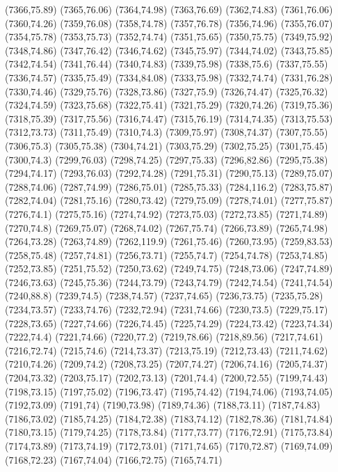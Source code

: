 (7366,75.89)
(7365,76.06)
(7364,74.98)
(7363,76.69)
(7362,74.83)
(7361,76.06)
(7360,74.26)
(7359,76.08)
(7358,74.78)
(7357,76.78)
(7356,74.96)
(7355,76.07)
(7354,75.78)
(7353,75.73)
(7352,74.74)
(7351,75.65)
(7350,75.75)
(7349,75.92)
(7348,74.86)
(7347,76.42)
(7346,74.62)
(7345,75.97)
(7344,74.02)
(7343,75.85)
(7342,74.54)
(7341,76.44)
(7340,74.83)
(7339,75.98)
(7338,75.6)
(7337,75.55)
(7336,74.57)
(7335,75.49)
(7334,84.08)
(7333,75.98)
(7332,74.74)
(7331,76.28)
(7330,74.46)
(7329,75.76)
(7328,73.86)
(7327,75.9)
(7326,74.47)
(7325,76.32)
(7324,74.59)
(7323,75.68)
(7322,75.41)
(7321,75.29)
(7320,74.26)
(7319,75.36)
(7318,75.39)
(7317,75.56)
(7316,74.47)
(7315,76.19)
(7314,74.35)
(7313,75.53)
(7312,73.73)
(7311,75.49)
(7310,74.3)
(7309,75.97)
(7308,74.37)
(7307,75.55)
(7306,75.3)
(7305,75.38)
(7304,74.21)
(7303,75.29)
(7302,75.25)
(7301,75.45)
(7300,74.3)
(7299,76.03)
(7298,74.25)
(7297,75.33)
(7296,82.86)
(7295,75.38)
(7294,74.17)
(7293,76.03)
(7292,74.28)
(7291,75.31)
(7290,75.13)
(7289,75.07)
(7288,74.06)
(7287,74.99)
(7286,75.01)
(7285,75.33)
(7284,116.2)
(7283,75.87)
(7282,74.04)
(7281,75.16)
(7280,73.42)
(7279,75.09)
(7278,74.01)
(7277,75.87)
(7276,74.1)
(7275,75.16)
(7274,74.92)
(7273,75.03)
(7272,73.85)
(7271,74.89)
(7270,74.8)
(7269,75.07)
(7268,74.02)
(7267,75.74)
(7266,73.89)
(7265,74.98)
(7264,73.28)
(7263,74.89)
(7262,119.9)
(7261,75.46)
(7260,73.95)
(7259,83.53)
(7258,75.48)
(7257,74.81)
(7256,73.71)
(7255,74.7)
(7254,74.78)
(7253,74.85)
(7252,73.85)
(7251,75.52)
(7250,73.62)
(7249,74.75)
(7248,73.06)
(7247,74.89)
(7246,73.63)
(7245,75.36)
(7244,73.79)
(7243,74.79)
(7242,74.54)
(7241,74.54)
(7240,88.8)
(7239,74.5)
(7238,74.57)
(7237,74.65)
(7236,73.75)
(7235,75.28)
(7234,73.57)
(7233,74.76)
(7232,72.94)
(7231,74.66)
(7230,73.5)
(7229,75.17)
(7228,73.65)
(7227,74.66)
(7226,74.45)
(7225,74.29)
(7224,73.42)
(7223,74.34)
(7222,74.4)
(7221,74.66)
(7220,77.2)
(7219,78.66)
(7218,89.56)
(7217,74.61)
(7216,72.74)
(7215,74.6)
(7214,73.37)
(7213,75.19)
(7212,73.43)
(7211,74.62)
(7210,74.26)
(7209,74.2)
(7208,73.25)
(7207,74.27)
(7206,74.16)
(7205,74.37)
(7204,73.32)
(7203,75.17)
(7202,73.13)
(7201,74.4)
(7200,72.55)
(7199,74.43)
(7198,73.15)
(7197,75.02)
(7196,73.47)
(7195,74.42)
(7194,74.06)
(7193,74.05)
(7192,73.09)
(7191,74)
(7190,73.98)
(7189,74.36)
(7188,73.11)
(7187,74.83)
(7186,73.02)
(7185,74.25)
(7184,72.38)
(7183,74.12)
(7182,78.36)
(7181,74.84)
(7180,73.15)
(7179,74.25)
(7178,73.84)
(7177,73.77)
(7176,72.91)
(7175,73.84)
(7174,73.89)
(7173,74.19)
(7172,73.01)
(7171,74.65)
(7170,72.87)
(7169,74.09)
(7168,72.23)
(7167,74.04)
(7166,72.75)
(7165,74.71)
